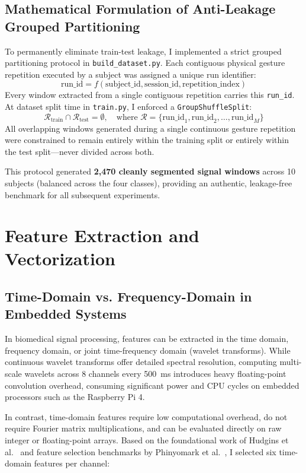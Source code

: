 \documentclass[11pt,a4paper]{article}
\begin{document}
\subsection{Mathematical Formulation of Anti-Leakage Grouped Partitioning}
To permanently eliminate train-test leakage, I implemented a strict grouped partitioning protocol in \texttt{build\_dataset.py}. Each contiguous physical gesture repetition executed by a subject was assigned a unique run identifier:
\begin{equation}
    \text{run\_id} = f(\text{subject\_id}, \text{session\_id}, \text{repetition\_index})
\end{equation}
Every window extracted from a single contiguous repetition carries this \texttt{run\_id}. At dataset split time in \texttt{train.py}, I enforced a \texttt{GroupShuffleSplit}:
\begin{equation}
    \mathcal{R}_{\text{train}} \cap \mathcal{R}_{\text{test}} = \emptyset, \quad \text{where } \mathcal{R} = \{\text{run\_id}_1, \text{run\_id}_2, \dots, \text{run\_id}_M\}
\end{equation}
All overlapping windows generated during a single continuous gesture repetition were constrained to remain entirely within the training split or entirely within the test split---never divided across both.

This protocol generated \textbf{2,470 cleanly segmented signal windows} across 10 subjects (balanced across the four classes), providing an authentic, leakage-free benchmark for all subsequent experiments.

\section{Feature Extraction and Vectorization}

\subsection{Time-Domain vs. Frequency-Domain in Embedded Systems}
In biomedical signal processing, features can be extracted in the time domain, frequency domain, or joint time-frequency domain (wavelet transforms). While continuous wavelet transforms offer detailed spectral resolution, computing multi-scale wavelets across 8 channels every 500~ms introduces heavy floating-point convolution overhead, consuming significant power and CPU cycles on embedded processors such as the Raspberry Pi 4.

In contrast, time-domain features require low computational overhead, do not require Fourier matrix multiplications, and can be evaluated directly on raw integer or floating-point arrays. Based on the foundational work of Hudgins et al.~\cite{hudgins1993} and feature selection benchmarks by Phinyomark et al.~\cite{phinyomark2012}, I selected six time-domain features per channel:
\end{document}
